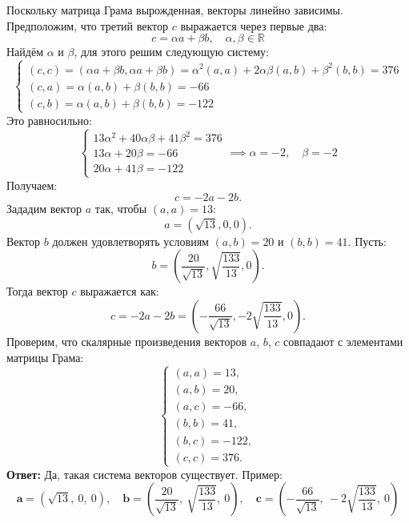 \documentclass[a4paper]{article}
\newcommand{\case}[1]{\begin{cases} #1 \end{cases}}
\newcommand{\RR}{\mathbb{R}}
\begin{document}
\begin{enumerate}
    Поскольку матрица Грама вырожденная, векторы линейно зависимы. Предположим, что третий вектор $c$ выражается через первые два:
    \[
    c = \alpha a + \beta b, \quad \alpha, \beta \in \RR
    \]
    Найдём $\alpha$ и $\beta$, для этого решим следующую систему:
    $$\case{
        (c, c) = (\alpha a + \beta b, \alpha a + \beta b) = \alpha^2(a,a) + 2\alpha\beta(a,b) + \beta^2(b,b) = 376\\
        (c, a) = \alpha(a, b) + \beta(b, b) = -66\\
        (c, b) = \alpha(a, b)+ \beta(b, b) = -122
    }$$
    Это равносильно:
    $$\case{
        13\alpha^2 + 40\alpha\beta + 41\beta^2 = 376\\
        13\alpha+20\beta = -66\\
        20\alpha+41\beta = -122
    } \implies \alpha= -2, \quad \beta = -2$$
    Получаем:
    \[
    c = -2a - 2b.
    \]
    Зададим вектор $a$ так, чтобы $(a, a) = 13$:
   \[
   a = (\sqrt{13}, 0, 0).
   \]
   Вектор $b$ должен удовлетворять условиям $(a, b) = 20$ и $(b, b) = 41$. Пусть:
   \[
   b = \left( \frac{20}{\sqrt{13}}, \sqrt{\frac{133}{13}}, 0 \right).
   \]
   Тогда вектор $c$ выражается как:
   \[
   c = -2a - 2b = \left( -\frac{66}{\sqrt{13}}, -2\sqrt{\frac{133}{13}}, 0 \right).
   \]
   Проверим, что скалярные произведения векторов $a$, $b$, $c$ совпадают с элементами матрицы Грама:
   \[
   \begin{cases}
   (a, a) = 13, \\
   (a, b) = 20, \\
   (a, c) = -66, \\
   (b, b) = 41, \\
   (b, c) = -122, \\
   (c, c) = 376.
   \end{cases}
   \]
    \textbf{Ответ:} Да, такая система векторов существует. Пример:
    \[
    \mathbf{a} = \left( \sqrt{13},\ 0,\ 0 \right), \quad
    \mathbf{b} = \left( \frac{20}{\sqrt{13}},\ \sqrt{\frac{133}{13}},\ 0 \right), \quad
    \mathbf{c} = \left( -\frac{66}{\sqrt{13}},\ -2\sqrt{\frac{133}{13}},\ 0 \right)
    \]

\end{enumerate}
\end{document}
